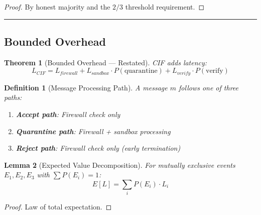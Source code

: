 \documentclass[
]{article}
\newtheorem{definition}{Definition}[section]
\newtheorem{theorem}{Theorem}[section]
\newtheorem{lemma}[theorem]{Lemma}
\begin{document}
\begin{proof}
By honest majority and the $2/3$ threshold requirement.
\end{proof}

\begin{center}\rule{0.5\linewidth}{0.5pt}\end{center}

\subsection{Bounded Overhead}\label{sec:thm511-proof}

\begin{theorem}[Bounded Overhead --- Restated]
\label{thm:overhead-restated}
CIF adds latency:
\begin{equation}
\label{eq:overhead-restated}
L_{CIF} = L_{firewall} + L_{sandbox} \cdot P(\text{quarantine}) + L_{verify} \cdot P(\text{verify})
\end{equation}
\end{theorem}

\begin{definition}[Message Processing Path]
\label{def:processing-path}
A message $m$ follows one of three paths:
\begin{enumerate}
\item \textbf{Accept path}: Firewall check only
\item \textbf{Quarantine path}: Firewall + sandbox processing
\item \textbf{Reject path}: Firewall check only (early termination)
\end{enumerate}
\end{definition}

\begin{lemma}[Expected Value Decomposition]
\label{lem:expected-decomposition}
For mutually exclusive events $E_1, E_2, E_3$ with $\sum P(E_i) = 1$:
\begin{equation}
\label{eq:expected-decomposition}
E[L] = \sum_i P(E_i) \cdot L_i
\end{equation}
\end{lemma}

\begin{proof}
Law of total expectation.
\end{proof}
\end{document}
